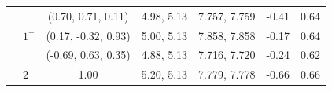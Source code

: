 \documentclass[prd,twocolumn,floatfix,nofootinbib]{revtex4}
\begin{document}
\begin{table}[!htbp]
\begin{tabular}{ccccccc}
                        &\multirow{3}{*}{$1^{+}$}
                                    &(0.70, 0.71, 0.11)     &4.98, 5.13	    &7.757, 7.759	    &-0.41                  &0.64 \\
                        &           &(0.17, -0.32, 0.93)    &5.00, 5.13	    &7.858, 7.858	    &-0.17                  &0.64 \\
                        &           &(-0.69, 0.63, 0.35)    &4.88, 5.13	    &7.716, 7.720	    &-0.24                  &0.62 \\
                        &$2^{+}$    &1.00                   &5.20, 5.13	    &7.779, 7.778	    &-0.66                  &0.66 \\
        \hline\hline
    \end{tabular}
\end{table}
\end{document}
